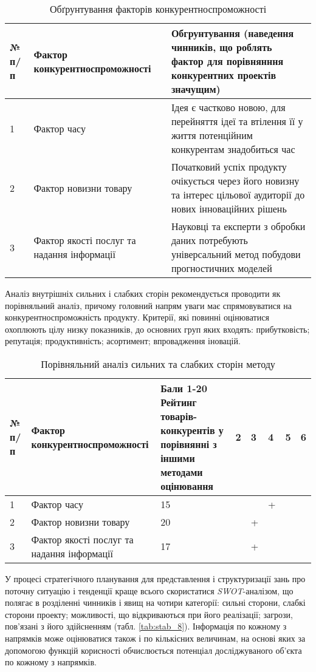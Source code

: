 \begin{table}[H]
\fontsize{12pt}{12pt}\selectfont
	\begin{tabularx}{\textwidth}{|l|X|X|}
    \hline
    № п/п & Фактор конкурентноспроможності & Обгрунтування (наведення чинників, що роблять фактор для порівнянння конкурентних проектів значущим) \\ \hline
    1 & Фактор часу & Ідея є частково новою, для перейняття ідеї та втілення її у життя потенційним конкурентам знадобиться час \\ \hline
    2 & Фактор новизни товару & Початковий успіх продукту очікується через його новизну та інтерес цільової аудиторії до нових інноваційних рішень \\ \hline
    3 & Фактор якості послуг та надання інформації & Науковці та експерти з обробки даних потребують універсальний метод побудови прогностичних моделей \\
    \hline
    \end{tabularx}
\caption{Обґрунтування факторів конкурентноспроможності} \label{tab:stab_6}
\end{table}

Аналіз внутрішніх сильних і слабких сторін рекомендується проводити як порівняльний аналіз, причому головний напрям уваги має спрямовуватися на конкурентноспроможність продукту. Критерії, які повинні оцінюватися охоплюють цілу низку показників, до основних груп яких входять: прибутковість; репутація; продуктивність; асортимент; впровадження іновацій.

\begin{table}[H]
\fontsize{12pt}{12pt}\selectfont
	\begin{tabularx}{\textwidth}{|l|X|X|X|X|X|X|X|}
    \hline
    № п/п & Фактор конкурентноспроможності & Бали 1-20 Рейтинг товарів-конкурентів у порівнянні з іншими методами оцінювання & 2 & 3 & 4 & 5 & 6 \\ \hline
    1 & Фактор часу & 15 & & & + & & \\ \hline
    2 & Фактор новизни товару & 20 & & + & & & \\ \hline
    3 & Фактор якості послуг та надання інформації & 17 & & + & & & \\
    \hline
    \end{tabularx}
\caption{Порівняльний аналіз сильних та слабких сторін методу} \label{tab:stab_7}
\end{table}

У процесі стратегічного планування для представлення і структуризації зань про поточну ситуацію і тенденції  краще всього скористатися \textit{SWOT}-аналізом, що полягає в розділенні чинників і явищ на чотири категорії: сильні сторони, слабкі сторони проекту; можливості, що відкриваються при його реалізації; загрози, пов'язані з його здійсненням (табл. \ref{tab:stab_8}). Інформація по кожному з напрямків може оцінюватися також і по кількісних величинам, на основі яких за допомогою функцій корисності обчислюється потенціал досліджуваного об'єкта по кожному з напрямків.

